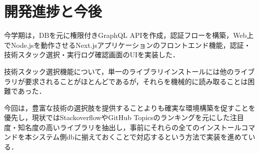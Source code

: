 \documentclass[main]{subfiles}
\begin{document}
\section{開発進捗と今後}
 今学期は，DBを元に権限付きGraphQL APIを作成，認証フローを構築，Web上でNode.jsを動作させるNext.jsアプリケーションのフロントエンド機能，認証・技術スタック選択・実行ログ確認画面のUIを実装した．

 技術スタック選択機能について，単一のライブラリインストールには他のライブラリが要求されることがほとんどであるが，それらを機械的に読み取ることは困難であった．

 今回は，豊富な技術の選択肢を提供することよりも確実な環境構築を促すことを優先し，現状ではStackoverflowやGitHub Topicsのランキングを元にした注目度・知名度の高いライブラリを抽出し，事前にそれらの全てのインストールコマンドを本システム側dbに揃えておくことで対応するという方法で実装を進めている．
\end{document}
